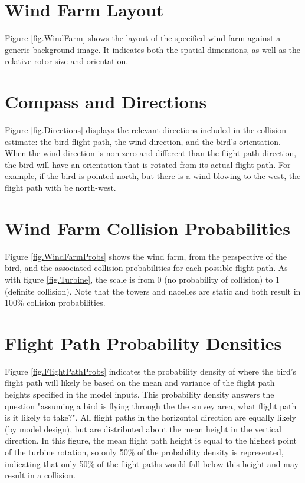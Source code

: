 \documentclass[11pt,letterpaper,openany]{report}
\begin{document}
\section{Wind Farm Layout}
Figure \ref{fig.WindFarm} shows the layout of the specified wind farm against a generic background image. It indicates
both the spatial dimensions, as well as the relative rotor size and orientation.

\section{Compass and Directions}
Figure \ref{fig.Directions} displays the relevant directions included in the collision estimate: the bird flight path,
the wind direction, and the bird's orientation. When the wind direction is non-zero and different than the flight path
direction, the bird will have an orientation that is rotated from its actual flight path. For example, if the bird is
pointed north, but there is a wind blowing to the west, the flight path with be north-west.

\section{Wind Farm Collision Probabilities}
Figure \ref{fig.WindFarmProbs} shows the wind farm, from the perspective of the bird, and the associated collision
probabilities for each possible flight path. As with figure \ref{fig.Turbine}, the scale is from 0 (no probability of
collision) to 1 (definite collision). Note that the towers and nacelles are static and both result in 100\% collision
probabilities.

\section{Flight Path Probability Densities}
Figure \ref{fig.FlightPathProbs} indicates the probability density of where the bird's flight path will likely be based
on the mean and variance of the flight path heights specified in the model inputs. This probability density answers the
question "assuming a bird is flying through the the survey area, what flight path is it likely to take?". All flight
paths in the horizontal direction are equally likely (by model design), but are distributed about the mean height in
the vertical direction. In this figure, the mean flight path height is equal to the highest point of the turbine
rotation, so only 50\% of the probability density is represented, indicating that only 50\% of the flight paths would
fall below this height and may result in a collision.
\end{document}

